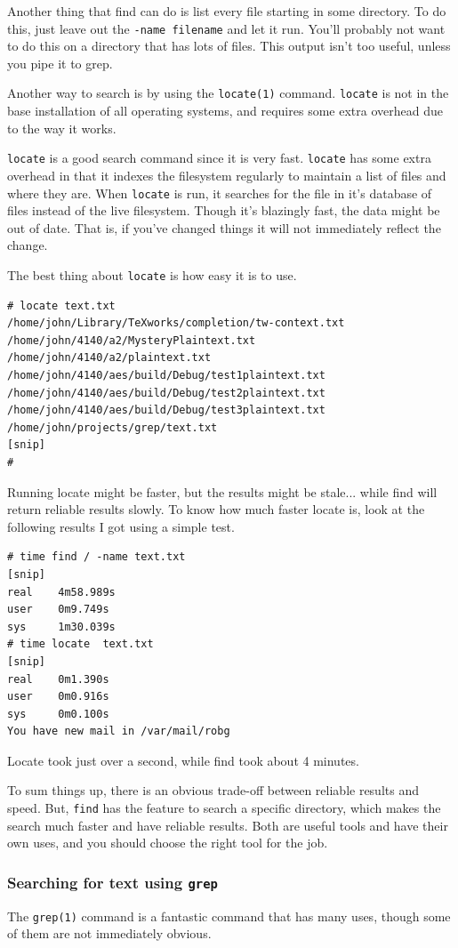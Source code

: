 Another thing that find can do is list every file starting in some 
directory.  To do this, just leave out the {\tt -name filename} 
and let it run. You'll probably not want to do this on a directory 
that has lots of files. This output isn't too useful, unless you 
pipe it to grep.

Another way to search is by using the {\tt locate(1)} command.  
{\tt locate} is not in the base installation of all operating 
systems, and requires some extra overhead due to the way 
it works.

{\tt locate} is a good search command since it is very fast.
{\tt locate} has some extra overhead in that it indexes the 
filesystem regularly to maintain a list of files and where they 
are. When {\tt locate} is run, it searches for the file in it's
database of files instead of the live filesystem. Though it's
blazingly fast, the data might be out of date. That is, if you've
changed things it will not immediately reflect the change.

The best thing about {\tt locate} is how easy it is to use.
{\tt \begin{verbatim}
# locate text.txt
/home/john/Library/TeXworks/completion/tw-context.txt
/home/john/4140/a2/MysteryPlaintext.txt
/home/john/4140/a2/plaintext.txt
/home/john/4140/aes/build/Debug/test1plaintext.txt
/home/john/4140/aes/build/Debug/test2plaintext.txt
/home/john/4140/aes/build/Debug/test3plaintext.txt
/home/john/projects/grep/text.txt
[snip]
#
\end{verbatim}
}

Running locate might be faster, but the results might be stale... while 
find will return reliable results slowly. To know how much faster locate is, look at the 
following results I got using a simple test.
{\tt \begin {verbatim}
# time find / -name text.txt
[snip]
real    4m58.989s
user    0m9.749s
sys     1m30.039s
# time locate  text.txt
[snip]
real    0m1.390s
user    0m0.916s
sys     0m0.100s
You have new mail in /var/mail/robg
\end{verbatim}
}
Locate took just over a second, while find took about 4 minutes. 


To sum things up, there is an obvious trade-off between reliable results and speed. But, 
{\tt find} has the feature to search a specific directory, which makes the search much faster 
and have reliable results. Both are useful tools and have their own uses, and you should 
choose the right tool for the job.

\subsubsection{Searching for text using {\tt grep}}
The {\tt grep(1)} command is a fantastic command that has 
many uses, though some of them are not immediately obvious.

